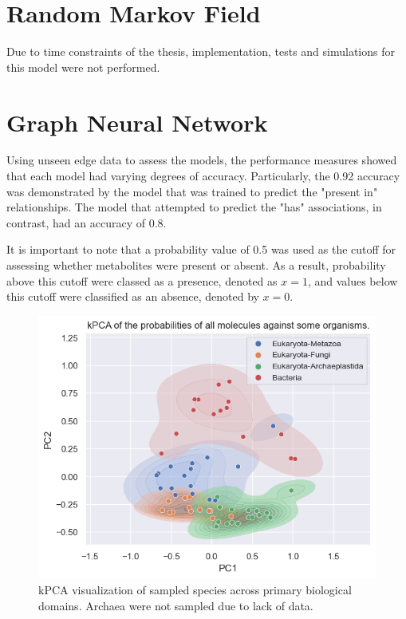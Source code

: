 \documentclass[
11pt, %
oneside, %
english, %
singlespacing, %
headsepline, %
chapterinoneline, %
]{MastersDoctoralThesis} %
\begin{document}
\section{Random Markov Field}
Due to time constraints of the thesis, implementation, tests and simulations for this model were not performed.

\section{Graph Neural Network}
Using unseen edge data to assess the models, the performance measures showed that each model had varying degrees of accuracy. Particularly, the 0.92 accuracy was demonstrated by the model that was trained to predict the "present in" relationships. The model that attempted to predict the "has" associations, in contrast, had an accuracy of 0.8.

It is important to note that a probability value of 0.5 was used as the cutoff for assessing whether metabolites were present or absent. As a result, probability above this cutoff were classed as a presence, denoted as $x=1$, and values below this cutoff were classified as an absence, denoted by $x=0$.

\begin{figure}[h]
	\centering
	\includegraphics[scale=0.7]{figure/kPCA}
	\caption{kPCA visualization of sampled species across primary biological domains. Archaea were not sampled due to lack of data.}
	\label{fig:kPCA}
\end{figure}
\end{document}
